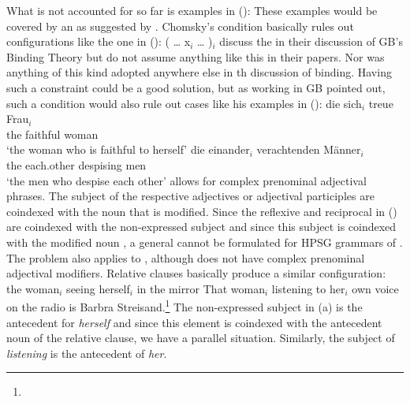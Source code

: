 \documentclass[output=paper,biblatex,babelshorthands,newtxmath,draftmode,colorlinks,citecolor=brown]{langscibook}
\begin{document}
What is not accounted for so far is  examples in ():
\eal
{}
\zl
These examples would be covered by an \iwithinic{} as suggested by
\citet[]{Chomsky81a}. Chomsky's condition basically rules out configurations like the one
in ():
\ea
( \ldots{} x$_i$ \ldots{} )$_i$
\z
\citet[]{ps2} discuss the \iwithinic in their discussion of GB's Binding Theory but do not
assume anything like this in their papers. Nor was anything of this kind adopted anywhere else in
th discussion of binding. Having such a constraint could be a good solution, but as
\citet[]{Fanselow86a} working in GB pointed out, such a condition would also rule out cases like his examples in ():
\eal
\ex
\gll die sich$_i$ treue Frau$_i$\\
     the \self{} faithful woman\\
\glt `the woman who is faithful to herself'
\ex 
\gll die einander$_i$ verachtenden Männer$_i$\\
     the each.other   despising    men\\
\glt `the men who despise each other'
\zl
{} allows for complex prenominal adjectival phrases. The subject of the respective adjectives or
adjectival participles are coindexed with the noun that is modified. Since the reflexive and
reciprocal in () are coindexed with the non-expressed subject and since this subject is
coindexed with the modified noun \citep[Section~3.2.7]{Mueller2002b}, a general \iwithinic cannot be formulated for HPSG
grammars of . The problem also applies to , although  does not have complex
prenominal adjectival modifiers. Relative clauses basically produce a similar configuration:
\ealnoraggedright
\ex the woman$_i$ seeing herself$_i$ in the mirror
\ex {}That woman$_i$ listening to her$_i$ own voice on the radio is Barbra Strei\-sand.\footnote{
}
\zl
The non-expressed subject in (a) is the antecedent for \emph{herself} and since this element
is coindexed with the antecedent noun of the relative clause, we have a parallel
situation. Similarly, the subject of \emph{listening} is the antecedent of \emph{her}.
\end{document}
